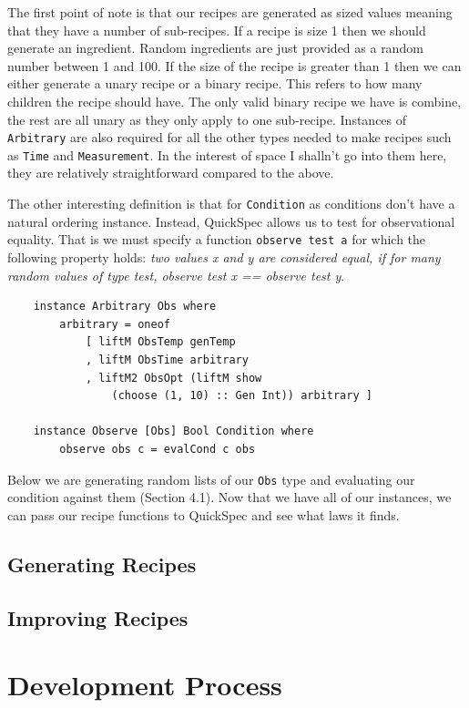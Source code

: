 \documentclass[11pt]{article}
\begin{document}
The first point of note is that our recipes are generated as sized values meaning
that they have a number of sub-recipes. If a recipe is size 1 then we should generate
an ingredient. Random ingredients are just provided as a random number between 1 and 100.
If the size of the recipe is greater than 1 then we can either generate a unary recipe
or a binary recipe. This refers to how many children the recipe should have. The only
valid binary recipe we have is combine, the rest are all unary as they only apply to
one sub-recipe. Instances of \texttt{Arbitrary} are also required for all the other types
needed to make recipes such as \texttt{Time} and \texttt{Measurement}. In the interest
of space I shalln't go into them here, they are relatively straightforward compared to
the above.

\medbreak

The other interesting definition is that for \texttt{Condition} as conditions don't
have a natural ordering instance. Instead, QuickSpec allows us to test for observational
equality. That is we must specify a function \texttt{observe test a} for which the
following property holds: \textit{two values x and y are considered equal,
if for many random values of type test, observe test x == observe test y}.

\begin{lstlisting}
    instance Arbitrary Obs where
        arbitrary = oneof
            [ liftM ObsTemp genTemp
            , liftM ObsTime arbitrary
            , liftM2 ObsOpt (liftM show
                (choose (1, 10) :: Gen Int)) arbitrary ]

    instance Observe [Obs] Bool Condition where
        observe obs c = evalCond c obs
\end{lstlisting}

Below we are generating random lists of our \texttt{Obs} type and evaluating our
condition against them (Section 4.1). Now that we have all of our instances,
we can pass our recipe functions to QuickSpec and see what laws it finds.

\subsection{Generating Recipes}

\subsection{Improving Recipes}

\section{Development Process}
\end{document}
